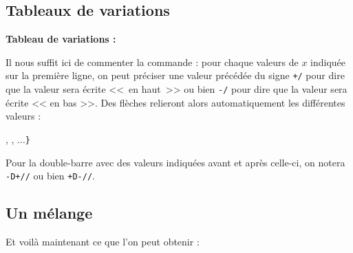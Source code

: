 \documentclass[10pt,french,openright,twoside]{book}
\begin{document}
 \subsection{Tableaux de variations}

 {\NewFont
\begin{CenterExample}
    \textbf{Tableau de variations :}\par
\end{CenterExample}
}\bigskip

Il nous suffit ici de commenter la commande  : pour chaque valeurs de $x$ indiquée sur la première ligne, on peut préciser une valeur précédée du signe \verb!+/! pour dire que la valeur sera écrite <<~en haut~>> ou bien \verb!-/! pour dire que la valeur sera écrite << en bas >>. Des flèches relieront alors automatiquement les différentes valeurs :
\begin{center}
     ,  , ...{\tt\}}
\end{center}

\begin{info}
    Pour la double-barre avec des valeurs indiquées avant et après celle-ci, on notera {\tt -D+//} ou bien {\tt +D-//}.
\end{info}

\subsection{Un mélange}
Et voilà maintenant ce que l'on peut obtenir :

 {\NewFont
\begin{CenterExample}
\end{CenterExample}
}
\end{document}
